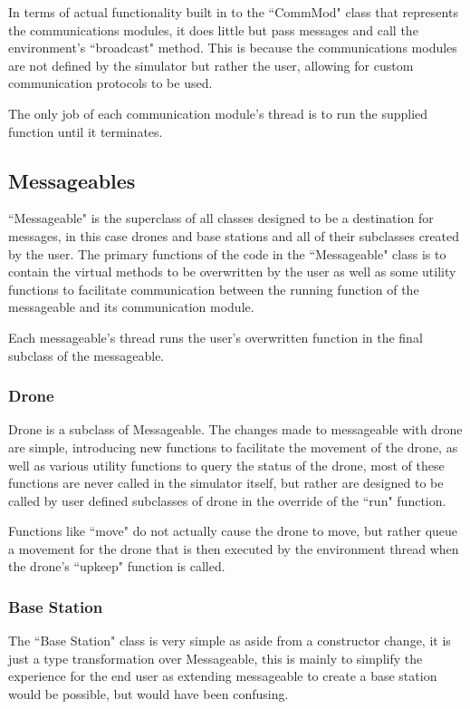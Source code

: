 		In terms of actual functionality built in to the ``CommMod" class that represents the communications
		modules, it does little but pass messages and call the environment's ``broadcast" method. This is because
		the communications modules are not defined by the simulator but rather the user, allowing for custom
		communication protocols to be used.

		The only job of each communication module's thread is to run the supplied function until it terminates.

	\subsection{Messageables}
		``Messageable" is the superclass of all classes designed to be a destination for messages, in this case
		drones and base stations and all of their subclasses created by the user. The primary functions of the
		code in the ``Messageable" class is to contain the virtual methods to be overwritten by the user as
		well as some utility functions to facilitate communication between the running function of the messageable
		and its communication module.

		Each messageable's thread runs the user's overwritten function in the final subclass of the messageable.

		\subsubsection{Drone}
			Drone is a subclass of Messageable. The changes made to messageable with drone are simple, introducing
			new functions to facilitate the movement of the drone, as well as various utility functions to query the
			status of the drone, most of these functions are never called in the simulator itself, but rather are
			designed to be called by user defined subclasses of drone in the override of the ``run" function.

			Functions like ``move" do not actually cause the drone to move, but rather queue a movement for the drone
			that is then executed by the environment thread when the drone's ``upkeep" function is called.

		\subsubsection{Base Station}
			The ``Base Station" class is very simple as aside from a constructor change, it is just a type transformation
			over Messageable, this is mainly to simplify the experience for the end user as extending messageable to create
			a base station would be possible, but would have been confusing.

